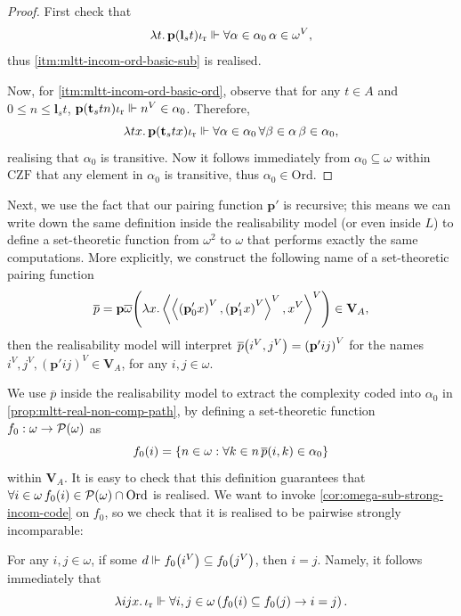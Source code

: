 \documentclass[12pt,openany]{book}
\theoremstyle{plain}
\theoremstyle{definition}
\newcommand\tuple[1]{\left\langle #1 \right\rangle}
\newcommand\opA[1]{\mathop{\forall #1}}
\newcommand\oplam[1]{\mathop{\lambda #1.}}
\newcommand\Pow{\mathcal{P}}
\newcommand\CZF{\mathrm{CZF}}
\newcommand\Ord{\mathrm{Ord}}
\newcommand\bp{\mathbf{p}}
\newcommand\bl{\mathbf{l}}
\newcommand\bt{\mathbf{t}}
\newcommand\ior{\iota_\textup{r}}
\newcommand\bV{\mathbf{V}}
\begin{document}
\begin{proof}
  First check that
  \[\oplam{t} \bp \mleft(\bl_s t\mright) \ior \Vdash \opA{\alpha \in \alpha_0} \alpha \in \omega^V,\]
  thus \ref{itm:mltt-incom-ord-basic-sub} is realised.

  Now, for \ref{itm:mltt-incom-ord-basic-ord}, observe that for any $t \in A$ and $0 \leq n \leq \bl_s t$, $\bp \mleft(\bt_s tn\mright) \ior \Vdash n^V \in \alpha_0$. Therefore,
  \[\oplam{tx} \bp \mleft(\bt_s tx\mright) \ior \Vdash \opA{\alpha \in \alpha_0} \opA{\beta \in \alpha} \beta \in \alpha_0,\]
  realising that $\alpha_0$ is transitive. Now it follows immediately from $\alpha_0 \subseteq \omega$ within $\CZF$ that any element in $\alpha_0$ is transitive, thus $\alpha_0 \in \Ord$.
\end{proof}

Next, we use the fact that our pairing function $\bp'$ is recursive; this means we can write down the same definition inside the realisability model (or even inside $L$) to define a set-theoretic function from $\omega^2$ to $\omega$ that performs exactly the same computations. More explicitly, we construct the following name of a set-theoretic pairing function
\[\overline{p} = \bp \overline{\omega} \mleft(\oplam{x} \tuple{\tuple{\left(\bp'_0 x\right)^V, \left(\bp'_1 x\right)^V}^V, x^V}^V\mright) \in \bV_A,\]
then the realisability model will interpret $\overline{p}\mleft(i^V, j^V\mright) = \left(\bp' ij\right)^V$ for the names $i^V, j^V, \left(\bp' ij\right)^V \in \bV_A$, for any $i, j \in \omega$.

We use $\overline{p}$ inside the realisability model to extract the complexity coded into $\alpha_0$ in \autoref{prop:mltt-real-non-comp-path}, by defining a set-theoretic function $f_0 : \omega \rightarrow \Pow\mleft(\omega\mright)$ as
\[f_0\mleft(i\mright) = \left\{n \in \omega : \opA{k \in n} \overline{p}\mleft(i, k\mright) \in \alpha_0\right\}\]
within $\bV_A$. It is easy to check that this definition guarantees that $\opA{i \in \omega} f_0\mleft(i\mright) \in \Pow\mleft(\omega\mright) \cap \Ord$ is realised. We want to invoke \autoref{cor:omega-sub-strong-incom-code} on $f_0$, so we check that it is realised to be pairwise strongly incomparable:

\begin{proposition}
  \label{prop:f-subset-eq}
  For any $i, j \in \omega$, if some $d \Vdash f_0\mleft(i^V\mright) \subseteq f_0\mleft(j^V\mright)$, then $i = j$. Namely, it follows immediately that
  \[\oplam{ijx} \ior \Vdash \opA{i, j \in \omega} \left(f_0\mleft(i\mright) \subseteq f_0\mleft(j\mright) \rightarrow i = j\right).\]
\end{proposition}
\end{document}
